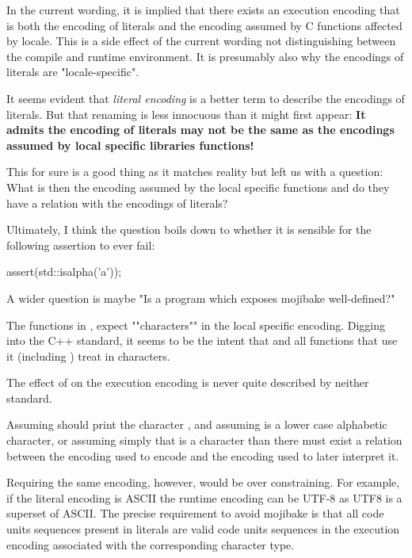 \documentclass{wg21}
\begin{document}
In the current wording, it is implied that there exists an execution encoding that is both the encoding of literals and
the encoding assumed by C functions affected by locale.
This is a side effect of the current wording not distinguishing between the compile and runtime environment.
It is presumably also why the encodings of literals are "locale-specific".

It seems evident that \emph{literal encoding} is a better term to describe the encodings of literals.
But that renaming is less innocuous than it might first appear:
\textbf{It admits the encoding of literals may not be the same as the encodings assumed by local specific libraries functions!}

This for sure is a good thing as it matches reality but left us with a question: What is then the encoding assumed by the local specific functions and do they have a relation with the encodings of literals?

Ultimately, I think the question boils down to whether it is sensible for the following assertion to ever fail:

\begin{colorblock}
assert(std::isalpha('a'));
\end{colorblock}

A wider question is maybe "Is a program which exposes mojibake well-defined?"

The functions in ,  expect ""characters"" in the local specific encoding.
Digging into the C++ standard, it seems to be the intent that 
and all functions that use it (including ) treat in characters.

The effect of  on the execution encoding is never quite described by neither standard.

Assuming  should print the character , and assuming  is a lower case alphabetic character,
or assuming simply that  is a character than there must exist a relation between the encoding used to encode 
and the encoding used to later interpret it.

Requiring the same encoding, however, would be over constraining.
For example, if the literal encoding is ASCII the runtime encoding can be UTF-8 as UTF8 is a superset of ASCII.
The precise requirement to avoid mojibake is that all code units sequences present in literals are valid code units sequences in
the execution encoding associated with the corresponding character type.
\end{document}
